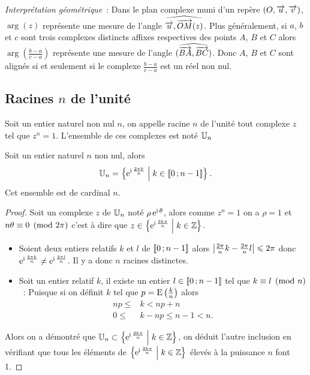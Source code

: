 \emph{Interprétation géométrique}~: Dans le plan complexe muni d'un repère \((O,\overrightarrow{u}, \overrightarrow{v})\), \(\arg(z)\) représente une mesure de l'angle \(\widehat{\overrightarrow{u}, \overrightarrow{OM}(z)}\). Plus généralement, si \(a\), \(b\) et \(c\) sont trois complexes distincts affixes respectives des points \(A\), \(B\) et \(C\) alors \(\arg\left(\frac{b-a}{c-a}\right)\) représente une mesure de l'angle \((\widehat{\overrightarrow{BA},\overrightarrow{BC}})\). Donc \(A\), \(B\) et \(C\) sont alignés si et seulement si le complexe \(\frac{b-a}{c-a}\) est un réel non nul.
%
\subsection{Racines \(n\)\iemes{} de l'unité}
\label{subsec:racineunite}
\begin{defdef}
  Soit un entier naturel non nul \(n\), on appelle racine \(n\)\iemes{} de l'unité tout complexe \(z\) tel que \(z^n=1\). L'ensemble de ces complexes est noté \(\mathbb{U}_n\)
\end{defdef}
\begin{prop}
  Soit un entier naturel \(n\) non nul, alors
  \begin{equation}
    \mathbb{U}_n=\left\{\operatorname{e}^{\operatorname{i} \frac{2 \pi k}{n}}\mathrel{}\middle|\mathrel{}k\in\mathopen{\llbracket}0\mathclose{}\mathpunct{};n-1\mathclose{\rrbracket}\right\}.
  \end{equation}
  Cet ensemble est de cardinal \(n\).
\end{prop}
\begin{proof}
  Soit un complexe \(z\) de \(\mathbb{U}_n\) noté \(\rho \operatorname{e}^{\operatorname{i} \theta}\), alors comme \(z^n=1\) on a \(\rho=1\) et \(n\theta \equiv 0 \pmod {2\pi}\) c'est à dire que \(z \in \left\{\operatorname{e}^{\operatorname{i} \frac{2k\pi}{n}}\mathrel{}\middle|\mathrel{}k \in \mathbb{Z}\right\}\).
  \begin{itemize}
  \item Soient deux entiers relatifs \(k\) et \(l\) de \(\mathopen{\llbracket}0\mathclose{}\mathpunct{};n-1\mathclose{\rrbracket}\) alors \(\left\lvert\frac{2\pi}{n}k - \frac{2\pi}{n}l\right\rvert \leqslant 2\pi\) donc \(\operatorname{e}^{\operatorname{i} \frac{2\pi k}{n}} \neq \operatorname{e}^{\operatorname{i} \frac{2\pi l}{n}}\). Il y a donc \(n\) racines distinctes.
  \item Soit un entier relatif \(k\), il existe un entier \(l \in \mathopen{\llbracket}0\mathclose{}\mathpunct{};n-1\mathclose{\rrbracket}\) tel que \(k \equiv l \pmod {n}\)~:
      Puisque si on définit \(k\) tel que \(p=\operatorname{E}\left( \frac{k}{n} \right)\) alors
      \begin{align}
        np \leqslant & k < np +n \\
        0 \leqslant & k-np \leqslant n-1 <n.
      \end{align}
    \end{itemize}
    Alors on a démontré que \(\mathbb{U}_n \subset \left\{\operatorname{e}^{\operatorname{i} \frac{2k\pi}{n}}\mathrel{}\middle|\mathrel{}k \in \mathbb{Z}\right\}\), on déduit l'autre inclusion en vérifiant que tous les éléments de \(\left\{\operatorname{e}^{\operatorname{i} \frac{2k\pi}{n}}\mathrel{}\middle|\mathrel{}k \in \mathbb{Z}\right\}\) élevés à la puissance \(n\) font 1.
\end{proof}

